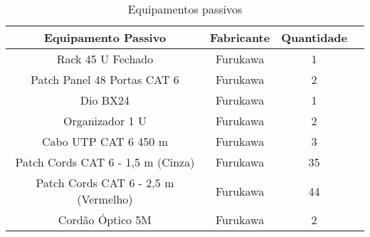 \begin{table}[h!]
	\caption{Equipamentos passivos}
	\label{tab8}
	\begin{center}
		\renewcommand{\arraystretch}{1.2}
		\begin{tabular}{|c|c|c|c|}
			\hline
			\textbf{Equipamento Passivo}      & \textbf{Fabricante} & \multicolumn{1}{l|}{\textbf{Quantidade}} \\ \hline
			Rack 45 U Fechado                 & Furukawa             & 1                                \\ \hline
			Patch Panel 48 Portas CAT 6      & Furukawa          & 2                                \\ \hline
			Dio  BX24 						& Furukawa  		   &
			1 								\\ \hline
			Organizador 1 U            		& Furukawa             & 2                               \\ \hline
			Cabo UTP CAT 6 450 m                 & Furukawa             & 3        \\ \hline		
			Patch Cords CAT 6 - 1,5 m (Cinza) & Furukawa                 & 35                            \\ \hline
			Patch Cords CAT 6 - 2,5 m (Vermelho) & Furukawa                 & 44                             		 \\ \hline
			Cordão Óptico 5M                     & Furukawa              & 2                                    \\ \hline
		\end{tabular}
	\end{center}
\end{table}